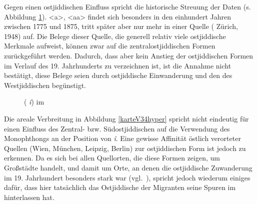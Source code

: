  
 Gegen einen ostjiddischen Einfluss spricht die historische Streuung der Daten (s. Abbildung \ref{V34i}). <a>, <aa> findet sich besonders in den einhundert Jahren zwischen 1775 und 1875, tritt später aber nur mehr in einer Quelle ( Zürich, 1948) auf. Die Belege dieser Quelle, die generell relativ viele ostjiddische Merkmale aufweist, können zwar auf die zentralostjiddischen Formen zurückgeführt werden. Dadurch, dass aber kein Anstieg der ostjiddischen Formen im Verlauf des 19. Jahrhunderts zu verzeichnen ist, ist die Annahme nicht bestätigt, diese Belege seien durch ostjiddische Einwanderung und den  des Westjiddischen begünstigt.

\begin{figure}
\fittable{
	\begin{tikzpicture}
		\begin{axis}[only marks, width=0.82\textwidth,height=0.2\textheight,
		legend style={at={(1,1)},xshift=+0.2cm, yshift=-0.5cm,anchor=north west,nodes=left},
			xtick={1700, 1725, 1750, 1775, 1800, 1825, 1850, 1875, 1900, 1925, 1950, 1975}, ytick=\empty,
			x tick label style={/pgf/number format/1000 sep=}, 
			y tick label style={/pgf/number format/1000 sep=},
			extra y tick style={grid=major,
				tick label style={, ,}},
				ymin=0.7,
				ymax=2.7,
			ylabel={Phänomenbelege},
			enlarge x limits=0.03]	
	
			

\addplot [mark=*, black] table [x=jahr, y=hyperV24] {figures/hyperv24dia.txt};%
\addplot [mark=o, black] table [x=jahr, y=no] {figures/hyperv24dia_no.txt};%

						\legend{\hai{V34} ({\mhd} \textit{î}) als <a>, unmanipuliert} %
		\end{axis}
	\end{tikzpicture}
}
	\caption{ ({\mhd} \textit{î}) im }
	\label{V34i}	
\end{figure}

Die areale Verbreitung in Abbildung \ref{karteV34hyper} spricht nicht eindeutig für einen Einfluss des Zentral- bzw. Südostjiddischen auf die Verwendung des Monophthongs an der Position von {\mhd} \textit{î}. Eine gewisse Affinität östlich verorteter Quellen (Wien, München, Leipzig, Berlin) zur ostjiddischen Form ist jedoch zu erkennen. Da es sich bei allen Quellorten, die diese Formen zeigen, um Großstädte handelt, und damit um Orte, an denen die ostjiddische Zuwanderung im 19. Jahrhundert besonders stark war (vgl.\, \citealt{Lestschinsky1960}), spricht jedoch wiederum einiges dafür, dass hier tatsächlich das Ostjiddische der Migranten seine Spuren im \hai{{\LiJieins}} hinterlassen hat. 
    


